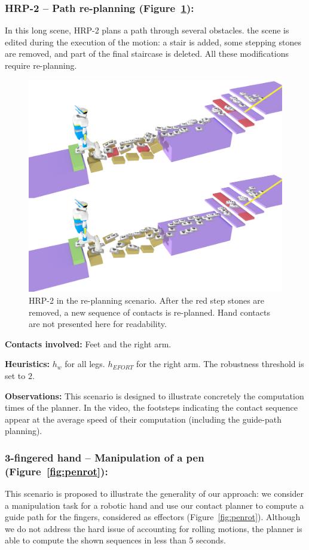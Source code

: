 \subsubsection{HRP-2 -- Path re-planning (Figure~\ref{fig:re-planning}):}
In this long scene, HRP-2 plans a path through several obstacles. the scene is edited during the execution of the motion: a stair is added,
some stepping stones are removed, and part of the final staircase is deleted. All these modifications require re-planning.


\begin{figure}
  \centering
  \includegraphics[width=0.7\linewidth]{figures/replanning}
  \caption{
           HRP-2 in the re-planning scenario. After the red step stones are removed, a new sequence of contacts is re-planned. Hand contacts
           are not presented here for readability.}
		   \label{fig:re-planning}
\end{figure}

\noindent\textbf{Contacts involved:} Feet and the right arm.

\noindent\textbf{Heuristics:} $h_w$  for all legs. $h_{EFORT}$  for the right arm. The robustness threshold is set to $2$.

\noindent\textbf{Observations:} This scenario is designed to illustrate concretely the computation times of the planner.
In the video, the footsteps indicating the contact sequence appear at the average speed of their computation (including the guide-path planning).


\subsubsection{3-fingered hand -- Manipulation of a pen (Figure~\ref{fig:penrot}):}
This scenario is proposed to illustrate the generality of our approach: we consider a manipulation task for a robotic hand and use
our contact planner to compute a guide path for the fingers, considered as effectors (Figure~\ref{fig:penrot}).
Although we do not address the hard issue of accounting for rolling motions, the planner is able to compute the shown sequences in less than 5 seconds.

